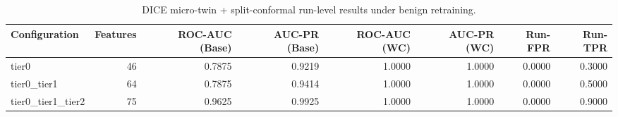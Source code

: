\begin{table}[t]
\centering
\caption{DICE micro-twin + split-conformal run-level results under benign retraining.}
\label{tab:dice_full_overall}
\footnotesize
\begin{tabular}{lrrrrrrr}
\toprule
Configuration & Features & ROC-AUC (Base) & AUC-PR (Base) & ROC-AUC (WC) & AUC-PR (WC) & Run-FPR & Run-TPR \\
\midrule
tier0 & 46 & 0.7875 & 0.9219 & 1.0000 & 1.0000 & 0.0000 & 0.3000 \\
tier0_tier1 & 64 & 0.7875 & 0.9414 & 1.0000 & 1.0000 & 0.0000 & 0.5000 \\
tier0_tier1_tier2 & 75 & 0.9625 & 0.9925 & 1.0000 & 1.0000 & 0.0000 & 0.9000 \\
\bottomrule
\end{tabular}

\end{table}
